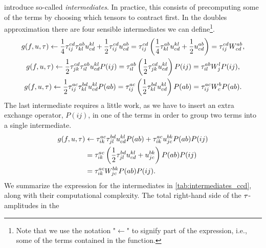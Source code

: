         introduce so-called \emph{intermediates}\cite{hjorth2017advanced}. In
        practice, this consists of precomputing some of the terms by choosing
        which tensors to contract first. In the doubles approximation there are
        four sensible intermediates we can define\footnote{Note that we use the
        notation "$\gets$" to signify part of the expression, i.e., some of the
        terms contained in the function.}.
        \begin{gather}
            g(f, u, \tau)
            \gets
            \frac{1}{4} \tau^{cd}_{ij} \tau^{ab}_{kl} u^{kl}_{cd}
            + \frac{1}{2} \tau^{cd}_{ij} u^{ab}_{cd}
            =
            \tau^{cd}_{ij}\left( 
                \frac{1}{4} \tau^{ab}_{kl} u^{kl}_{cd}
                + \frac{1}{2} u^{ab}_{cd}
             \right)
            = \tau^{cd}_{ij}W^{ab}_{cd},
            \\
            g(f, u, \tau)
            \gets
            \frac{1}{2} \tau^{cd}_{jk} \tau^{ab}_{il} u^{kl}_{cd} P(ij)
            = \tau^{ab}_{il}\left( 
                \frac{1}{2} \tau^{cd}_{jk} u^{kl}_{cd}
             \right) P(ij)
            = \tau^{ab}_{il} W^{l}_{j} P(ij),
            \\
            g(f, u, \tau)
            \gets
            \frac{1}{2} \tau^{ac}_{ij} \tau^{bd}_{kl} u^{kl}_{cd} P(ab)
            = \tau^{ac}_{ij}\left( 
                \frac{1}{2} \tau^{bd}_{kl} u^{kl}_{cd}
             \right) P(ab)
            = \tau^{ac}_{ij} W^{b}_{c} P(ab).
        \end{gather}
        The last intermediate requires a little work, as we have to insert an
        extra exchange operator, $P(ij)$, in one of the terms in order to group
        two terms into a single intermediate.
        \begin{align}
            g(f, u, \tau)
            &\gets
            \tau^{ac}_{ik} \tau^{bd}_{jl} u^{kl}_{cd} P(ab)
            + \tau^{ac}_{ik} u^{bk}_{jc} P(ab) P(ij)
            \\
            &= \tau^{ac}_{ik}\left( 
                \frac{1}{2} \tau^{bd}_{jl} u^{kl}_{cd}
                + u^{bk}_{jc}
             \right) P(ab) P(ij)
            \\
            &= \tau^{ac}_{ik} W^{bk}_{jc} P(ab) P(ij).
        \end{align}
        We summarize the expression for the intermediates in
        \autoref{tab:intermediates_ccd}, along with their computational
        complexity. The total right-hand side of the $\tau$-amplitudes in the
